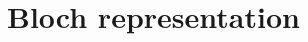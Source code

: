 \documentclass[11pt,a4paper]{report}
\begin{document}






\chapter{Bloch representation}
\end{document}
